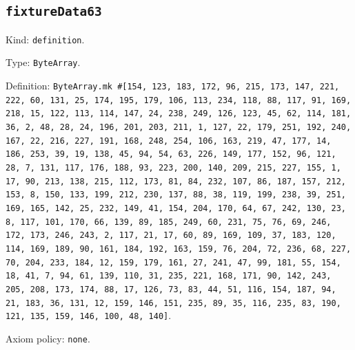 \documentclass[11pt]{article}
\begin{document}
\subsection*{\texttt{fixtureData63}}
\noindent Kind: \texttt{definition}.\par
\noindent Type: \texttt{ByteArray}.\par
\noindent Definition: \texttt{ByteArray.mk \#[154, 123, 183, 172, 96, 215, 173, 147, 221, 222, 60, 131, 25, 174, 195, 179, 106, 113, 234, 118, 88, 117, 91, 169, 218, 15, 122, 113, 114, 147, 24, 238, 249, 126, 123, 45, 62, 114, 181, 36, 2, 48, 28, 24, 196, 201, 203, 211, 1, 127, 22, 179, 251, 192, 240, 167, 22, 216, 227, 191, 168, 248, 254, 106, 163, 219, 47, 177, 14, 186, 253, 39, 19, 138, 45, 94, 54, 63, 226, 149, 177, 152, 96, 121, 28, 7, 131, 117, 176, 188, 93, 223, 200, 140, 209, 215, 227, 155, 1, 17, 90, 213, 138, 215, 112, 173, 81, 84, 232, 107, 86, 187, 157, 212, 153, 8, 150, 133, 199, 212, 230, 137, 88, 38, 119, 199, 238, 39, 251, 169, 165, 142, 25, 232, 149, 41, 154, 204, 170, 64, 67, 242, 130, 23, 8, 117, 101, 170, 66, 139, 89, 185, 249, 60, 231, 75, 76, 69, 246, 172, 173, 246, 243, 2, 117, 21, 17, 60, 89, 169, 109, 37, 183, 120, 114, 169, 189, 90, 161, 184, 192, 163, 159, 76, 204, 72, 236, 68, 227, 70, 204, 233, 184, 12, 159, 179, 161, 27, 241, 47, 99, 181, 55, 154, 18, 41, 7, 94, 61, 139, 110, 31, 235, 221, 168, 171, 90, 142, 243, 205, 208, 173, 174, 88, 17, 126, 73, 83, 44, 51, 116, 154, 187, 94, 21, 183, 36, 131, 12, 159, 146, 151, 235, 89, 35, 116, 235, 83, 190, 121, 135, 159, 146, 100, 48, 140]}.\par
\noindent Axiom policy: \texttt{none}.\par
\end{document}
